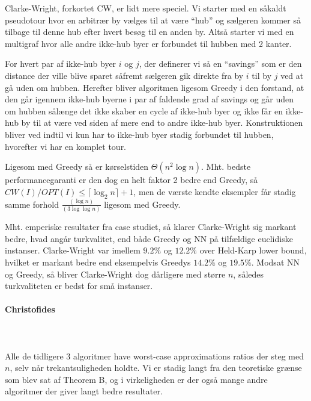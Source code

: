 Clarke-Wright, forkortet CW, er lidt mere speciel. Vi starter med en såkaldt pseudotour hvor en arbitrær by vælges til at være ``hub'' og sælgeren kommer så tilbage til denne hub efter hvert besøg til en anden by. Altså starter vi med en multigraf hvor alle andre ikke-hub byer er forbundet til hubben med 2 kanter. 

For hvert par af ikke-hub byer $i$ og $j$, der definerer vi så en ``savings'' som er den distance der ville blive sparet såfremt sælgeren gik direkte fra by $i$ til by $j$ ved at gå uden om hubben. Herefter bliver algoritmen ligesom Greedy i den forstand, at den går igennem ikke-hub byerne i par af faldende grad af savings og går uden om hubben sålænge det ikke skaber en cycle af ikke-hub byer og ikke får en ikke-hub by til at være ved siden af mere end to andre ikke-hub byer. 
Konstruktionen bliver ved indtil vi kun har to ikke-hub byer stadig forbundet til hubben, hvorefter vi har en komplet tour.

Ligesom med Greedy så er kørselstiden $\Theta(n^2 \log n)$. Mht. bedste performancegaranti er den dog en helt faktor 2 bedre end Greedy, så $CW(I)/OPT(I) \leq \lceil \log_2 n \rceil + 1$, men de værste kendte eksempler får stadig samme forhold $\frac{(\log n)}{(3 \log \log n)}$ ligesom med Greedy.

Mht. emperiske resultater fra case studiet, så klarer Clarke-Wright sig markant bedre, hvad angår turkvalitet, end både Greedy og NN på tilfældige euclidiske instanser. Clarke-Wright var imellem $9.2\%$ og $12.2\%$ over Held-Karp lower bound, hvilket er markant bedre end eksempelvis Greedys $14.2\%$ og $19.5\%$. Modsat NN og Greedy, så bliver Clarke-Wright dog dårligere med større $n$, således turkvaliteten er bedst for små instanser.

\paragraph{Christofides}
~\\
~\\

Alle de tidligere 3 algoritmer have worst-case approximations ratios der steg med $n$, selv når trekantsuligheden holdte. Vi er stadig langt fra den teoretiske grænse som blev sat af Theorem B, og i virkeligheden er der også mange andre algoritmer der giver langt bedre resultater.

